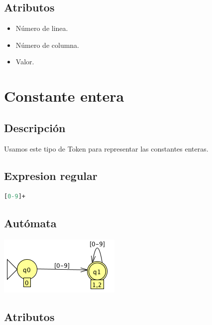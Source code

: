         \subsection{Atributos}
        
            \begin{itemize}
                \item Número de linea.
                \item Número de columna.
                \item Valor.
            \end{itemize}

            \hfill
            \clearpage
            



	\section{Constante entera}
    
        \subsection{Descripción}
        
            Usamos este tipo de Token para representar las constantes enteras.
        
        \subsection{Expresion regular}
        
            \begin{lstlisting}[language=Perl]
[0-9]+
            \end{lstlisting}

        \subsection{Autómata}
        
	        \includegraphics[scale=.7]{../Design/jflap/Constante_entera.png}

        \subsection{Atributos}
        
